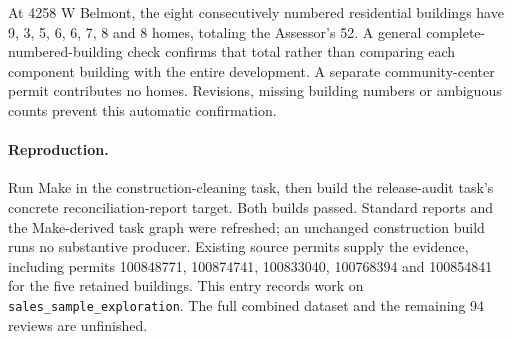 At 4258 W Belmont, the eight consecutively numbered residential buildings have 9, 3, 5, 6, 6, 7, 8 and 8 homes, totaling the Assessor's 52. A general complete-numbered-building check confirms that total rather than comparing each component building with the entire development. A separate community-center permit contributes no homes. Revisions, missing building numbers or ambiguous counts prevent this automatic confirmation.

\paragraph{Reproduction.} Run Make in the construction-cleaning task, then build the release-audit task's concrete reconciliation-report target. Both builds passed. Standard reports and the Make-derived task graph were refreshed; an unchanged construction build runs no substantive producer. Existing source permits supply the evidence, including permits 100848771, 100874741, 100833040, 100768394 and 100854841 for the five retained buildings. This entry records work on \texttt{sales\_sample\_exploration}. The full combined dataset and the remaining 94 reviews are unfinished.
